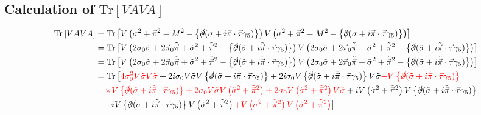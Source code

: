 \documentclass[tightenlines,floatfix,nofootinbib,superscriptaddress,fleqn]{revtex4-2}
\begin{document}
\subsection{Calculation of $\mathrm{Tr}\left[VAVA\right]$}
\begin{align}\label{1-1-1}
  \begin{split}
    \mathrm{Tr}\left[VAVA\right]
    &=\mathrm{Tr}\left[V\left(\sigma^2+\vec{\pi}^2-M^2
  -\left\{\slashed{\partial}(\sigma+i\vec{\pi}\cdot\vec{\tau}\gamma_5)
  \right\}\right)V\left(\sigma^2+\vec{\pi}^2-M^2
  -\left\{\slashed{\partial}(\sigma+i\vec{\pi}\cdot\vec{\tau}\gamma_5)
  \right\}\right)\right]  \\
  &=\mathrm{Tr}\left[V\left(2\sigma_0\tilde{\sigma}+2\vec{\pi}_0\tilde{\vec{\pi}}
  +\tilde{\sigma}^2+\tilde{\vec{\pi}}^2
  -\left\{\slashed{\partial}(\tilde{\sigma}+i\tilde{\vec{\pi}}\cdot\vec{\tau}\gamma_5)
  \right\}\right)V\left(2\sigma_0\tilde{\sigma}+2\vec{\pi}_0\tilde{\vec{\pi}}
  +\tilde{\sigma}^2+\tilde{\vec{\pi}}^2
  -\left\{\slashed{\partial}(\tilde{\sigma}+i\tilde{\vec{\pi}}\cdot\vec{\tau}\gamma_5)
  \right\}\right)\right]  \\
  &=\mathrm{Tr}\left[V\left(2\sigma_0\tilde{\sigma}+2\vec{\pi}_0\tilde{\vec{\pi}}
  +\tilde{\sigma}^2+\tilde{\vec{\pi}}^2
  -\left\{\slashed{\partial}(\tilde{\sigma}+i\tilde{\vec{\pi}}\cdot\vec{\tau}\gamma_5)
  \right\}\right)V\left(2\sigma_0\tilde{\sigma}+2\vec{\pi}_0\tilde{\vec{\pi}}
  +\tilde{\sigma}^2+\tilde{\vec{\pi}}^2
  -\left\{\slashed{\partial}(\tilde{\sigma}+i\tilde{\vec{\pi}}\cdot\vec{\tau}\gamma_5)
  \right\}\right)\right]  
  \\
  &=\mathrm{Tr}\left[{\color{red}4\sigma^2_0V\tilde{\sigma}V\tilde{\sigma}}
  +2i\sigma_0V\tilde{\sigma}V\left\{\slashed{\partial}(\tilde{\sigma}+i\tilde{\vec{\pi}}
  \cdot\vec{\tau}\gamma_5)\right\}
  +2i\sigma_0V\left\{\slashed{\partial}(\tilde{\sigma}+i\tilde{\vec{\pi}}
  \cdot\vec{\tau}\gamma_5)\right\}V\tilde{\sigma}
  {\color{red}-V\left\{\slashed{\partial}(\tilde{\sigma}+i\tilde{\vec{\pi}}\cdot\vec{\tau}\gamma_5)
  \right\}}\right.  \\
  &\left.\,\,\,\,\,{\color{red}\times V\left\{\slashed{\partial}(\tilde{\sigma}+i\tilde{\vec{\pi}}\cdot\vec{\tau}
  \gamma_5)\right\}
  +2\sigma_0V\tilde{\sigma}V\left(\tilde{\sigma}^2+\tilde{\vec{\pi}}^2\right)
  +2\sigma_0V\left(\tilde{\sigma}^2+\tilde{\vec{\pi}}^2\right)V\tilde{\sigma}}
  +iV\left(\tilde{\sigma}^2+\tilde{\vec{\pi}}^2\right)V\left\{\slashed{\partial}
  (\tilde{\sigma}+i\tilde{\vec{\pi}}\cdot\vec{\tau}\gamma_5)\right\}\right.  \\
  &\left.\,\,\,\,\,+iV\left\{\slashed{\partial}(\tilde{\sigma}+i\tilde{\vec{\pi}}\cdot\vec{\tau}
  \gamma_5)\right\}V\left(\tilde{\sigma}^2+\tilde{\vec{\pi}}^2\right)
  {\color{red}+V\left(\tilde{\sigma}^2+\tilde{\vec{\pi}}^2\right)V\left(\tilde{\sigma}^2+\tilde{\vec{\pi}}^2\right)}
  \right]  \\
\end{split}
\end{align}
\end{document}
